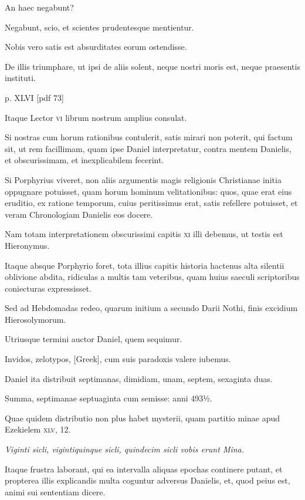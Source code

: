 \begin{parnumbers}
An haec negabunt?

Negabunt, scio, et scientes prudentesque mentientur.

Nobis vero satis
est absurditates eorum ostendisse.

De illis triumphare, ut ipsi de
aliis solent, neque nostri moris est, neque praesentis instituti.

\clearpage
p. XLVI [pdf 73]

Itaque
Lector \textsc{vi} librum nostrum amplius consulat.

Si nostras cum horum
rationibus contulerit, satis mirari non poterit, qui factum
sit, ut rem facillimam, quam ipse Daniel interpretatur, contra mentem
Danielis, et obscurissimam, et inexplicabilem fecerint.

Si Porphyrius
viveret, non aliis argumentis magis religionis Christianae
initia oppugnare potuisset, quam horum hominum velitationibus:
quos, quae erat eius eruditio, ex ratione temporum, cuius peritissimus
erat, satis refellere potuisset, et veram Chronologiam
Danielis eos docere.

Nam totam interpretationem obscurissimi
capitis \textsc{xi} illi debemus, ut testis est Hieronymus.

Itaque
absque Porphyrio foret, tota illius capitis historia hactenus alta
silentii oblivione abdita, ridiculas a multis tam veteribus, quam huius
saeculi scriptoribus coniecturas expressisset.

Sed ad Hebdomadas
redeo, quarum initium a secundo Darii Nothi, finis excidium
Hierosolymorum.

Utriusque termini auctor Daniel, quem sequimur.

Invidos, zelotypos, \textgreek{[Greek]}, cum suis paradoxis valere iubemus.

Daniel ita distribuit septimanas, dimidiam, unam, septem,
sexaginta duas.

Summa, septimanae septuaginta cum semisse: anni
493½.

Quae quidem distributio non plus habet mysterii, quam
partitio minae apud Ezekielem \textsc{xlv}, 12.

\textit{Viginti sicli, vigintiquinque
sicli, quindecim sicli vobis erunt Mina.}

Itaque frustra laborant,
qui ea intervalla aliquas epochas continere putant, et propterea
illis explicandis multa coguntur adversus Danielis, et, quod peius
est, animi sui sententiam dicere.


\end{parnumbers}
